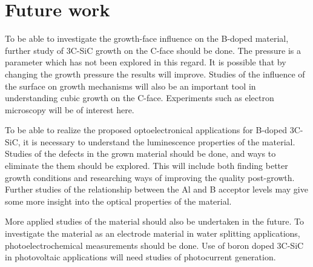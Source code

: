 
\chapter{Future work}
To be able to investigate the growth-face influence on the B-doped material, further study of 3C-SiC growth on the C-face should be done. The pressure is a parameter which has not been explored in this regard. It is possible that by changing the growth pressure the results will improve. Studies of the influence of the surface on growth mechanisms will also be an important tool in understanding cubic growth on the C-face. Experiments such as electron microscopy will be of interest here. 

To be able to realize the proposed optoelectronical applications for B-doped 3C-SiC, it is necessary to understand the luminescence properties of the material. Studies of the defects in the grown material should be done, and ways to eliminate the them should be explored. This will include both finding better growth conditions and researching ways of improving the quality post-growth. Further studies of the relationship between the Al and B acceptor levels may give some more insight into the optical properties of the material. 

More applied studies of the material should also be undertaken in the future. To investigate the material as an electrode material in water splitting applications, photoelectrochemical measurements should be done. Use of boron doped 3C-SiC in photovoltaic applications will need studies of photocurrent generation. 

